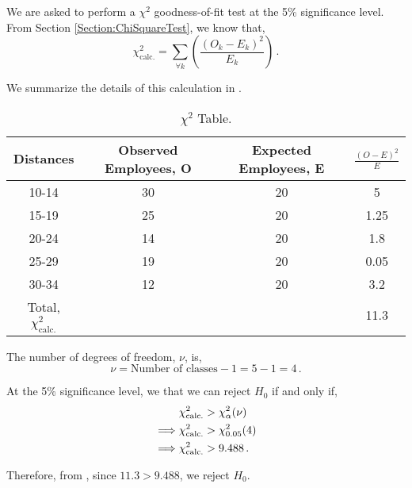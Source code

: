 \begin{subquestions}
\begin{subsubquestions}

\subsubquestion
We are asked to perform a $\chi^2$ goodness-of-fit test at the 5\% significance level. From Section \ref{Section:ChiSquareTest}, we know that,
\begin{equation}
	\chi^2_{\text{calc.}} = \sum_{\forall k} \left( \frac{(O_k-E_k)^2}{E_k}\right) \,.
\end{equation}

We summarize the details of this calculation in .
\begin{table}[H]
	\centering
	\begin{tabular}{|c|c|c|c|}
		\hline
		Distances & Observed Employees, O & Expected Employees, E & $\frac{(O-E)^2}{E}$\\
		\hline 
		10-14 & 30 & 20 & 5 \\
		15-19 & 25 & 20 & 1.25 \\
		20-24 & 14 & 20 & 1.8 \\
		25-29 & 19 & 20 & 0.05 \\
		30-34 & 12 & 20 & 3.2 \\
		\hline
		Total, $\chi^2_{\text{calc.}}$ & & & 11.3 \\
		\hline
	\end{tabular}
	\caption{\label{2010:q4:ChiTab} $\chi^2$ Table.}
\end{table}	

The number of degrees of freedom, $\nu$, is,
\begin{equation}
	\nu = \text{Number of classes}-1 = 5-1 = 4\,.
\end{equation}

At the 5\% significance level, we that we can reject $H_0$ if and only if,
\begin{align}
	&\chi^2_{\text{calc.}} > \chi^2_{\alpha}(\nu) \nonumber \\
	\implies & \chi^2_{\text{calc.}} > \chi^2_{0.05}(4) \nonumber \\
	\implies & \chi^2_{\text{calc.}} > 9.488 \,.
\end{align} 

Therefore, from , since $11.3>9.488$, we reject $H_0$.
\end{subsubquestions}

\end{subquestions}
